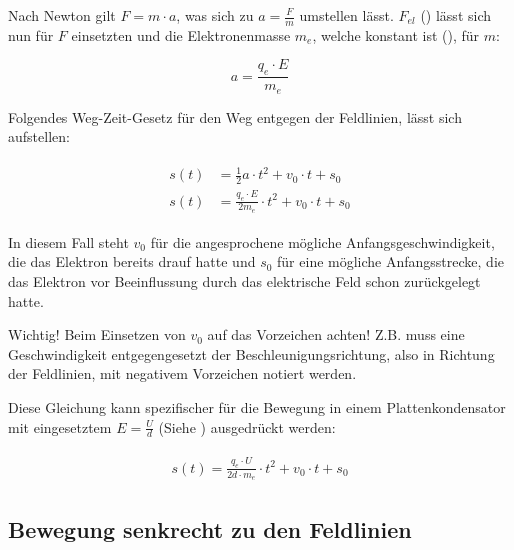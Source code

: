 
Nach Newton gilt $F = m \cdot a$, was sich zu $a = \frac{F}{m}$ umstellen lässt. $F_{el}$ () lässt sich nun für $F$ einsetzten und die Elektronenmasse $m_e$, welche konstant ist (), für $m$:

\begin{equation}
	a = \frac{q_e \cdot E}{m_e}
\end{equation}


Folgendes Weg-Zeit-Gesetz für den Weg entgegen der Feldlinien, lässt sich aufstellen:

\begin{align} \label{eq:s(t)Allgemein}
\begin{split}
	s(t) &= \frac{1}{2} a \cdot t^2 + v_0 \cdot t + s_0 \\
	s(t) &= \frac{q_e \cdot E}{2m_e} \cdot t^2 + v_0 \cdot t + s_0
\end{split}
\end{align}

\noindent In diesem Fall steht $v_0$ für die angesprochene mögliche Anfangsgeschwindigkeit, die das Elektron bereits \glqq drauf hatte\grqq{} und $s_0$ für eine mögliche Anfangsstrecke, die das Elektron vor Beeinflussung durch das elektrische Feld schon zurückgelegt hatte.

\begin{leftbar}
Wichtig! Beim Einsetzen von $v_0$ auf das Vorzeichen achten! Z.B. muss eine Geschwindigkeit entgegengesetzt der Beschleunigungsrichtung, also in Richtung der Feldlinien, mit negativem Vorzeichen notiert werden.
\end{leftbar}

Diese Gleichung kann spezifischer für die Bewegung in einem Plattenkondensator mit eingesetztem $E=\frac{U}{d}$ (Siehe ) ausgedrückt werden:

\begin{align} \label{eq:s(t)imKondensator}
\begin{split}
	s(t) = \frac{q_e \cdot U}{2d \cdot m_e} \cdot t^2 + v_0 \cdot t + s_0
\end{split}
\end{align}


\subsection{Bewegung senkrecht zu den Feldlinien} \label{subsec:BewegungsgesetzSenkrecht}

